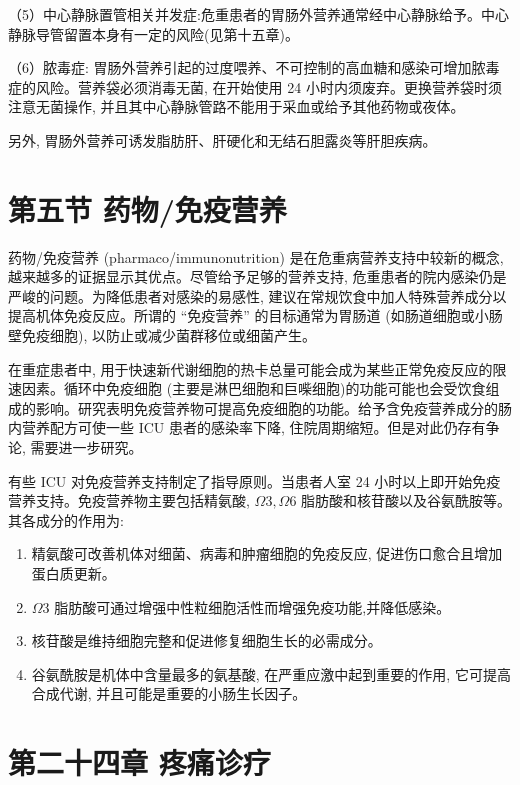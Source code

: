 \documentclass[10pt]{article}
\begin{document}
（5）中心静脉置管相关并发症:危重患者的胃肠外营养通常经中心静脉给予。中心静脉导管留置本身有一定的风险(见第十五章)。

（6）脓毒症: 胃肠外营养引起的过度喂养、不可控制的高血糖和感染可增加脓毒症的风险。营养袋必须消毒无菌, 在开始使用 24 小时内须废弃。更换营养袋时须注意无菌操作, 并且其中心静脉管路不能用于采血或给予其他药物或夜体。

另外, 胃肠外营养可诱发脂肪肝、肝硬化和无结石胆露炎等肝胆疾病。

\section*{第五节 药物/免疫营养}
药物/免疫营养 (pharmaco/immunonutrition) 是在危重病营养支持中较新的概念, 越来越多的证据显示其优点。尽管给予足够的营养支持, 危重患者的院内感染仍是严峻的问题。为降低患者对感染的易感性, 建议在常规饮食中加人特殊营养成分以提高机体免疫反应。所谓的 “免疫营养” 的目标通常为胃肠道 (如肠道细胞或小肠壁免疫细胞), 以防止或减少菌群移位或细菌产生。

在重症患者中, 用于快速新代谢细胞的热卡总量可能会成为某些正常免疫反应的限速因素。循环中免疫细胞 (主要是淋巴细胞和巨喍细胞)的功能可能也会受饮食组成的影响。研究表明免疫营养物可提高免疫细胞的功能。给予含免疫营养成分的肠内营养配方可使一些 ICU 患者的感染率下降, 住院周期缩短。但是对此仍存有争论, 需要进一步研究。

有些 ICU 对免疫营养支持制定了指导原则。当患者人室 24 小时以上即开始免疫营养支持。免疫营养物主要包括精氨酸, $\Omega 3, \Omega 6$ 脂肪酸和核苷酸以及谷氨酰胺等。其各成分的作用为:

\begin{enumerate}
  \item 精氨酸可改善机体对细菌、病毒和肿瘤细胞的免疫反应, 促进伤口愈合且增加蛋白质更新。

  \item $\Omega 3$ 脂肪酸可通过增强中性粒细胞活性而增强免疫功能,并降低感染。

  \item 核苷酸是维持细胞完整和促进修复细胞生长的必需成分。

  \item 谷氨酰胺是机体中含量最多的氨基酸, 在严重应激中起到重要的作用, 它可提高合成代谢, 并且可能是重要的小肠生长因子。

\end{enumerate}

\section*{第二十四章 疼痛诊疗}
\end{document}
